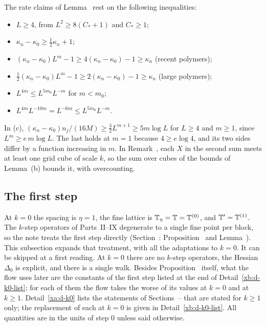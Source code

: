 \begin{detail}\label{xb:d-large}
The rate claims of Lemma~ rest on the following inequalities:
\begin{itemize}
\item $L\ge4$, from $L^2\ge8(C_*+1)$ and $C_*\ge1$;
\item $\kappa_n-\kappa_0\ge\frac12\kappa_n+1$;
\item $(\kappa_n-\kappa_0)L^m-1\ge4(\kappa_n-\kappa_0)-1\ge\kappa_n$ (recent polymers);
\item $\frac12(\kappa_n-\kappa_0)L^m-1\ge2(\kappa_n-\kappa_0)-1\ge\kappa_n$ (large polymers);
\item $L^{4m}\le L^{5m_0}L^{-m}$ for $m<m_0$;
\item $L^{4m}L^{-10m}=L^{-6m}\le L^{5m_0}L^{-m}$.
\end{itemize}
In (c), $(\kappa_n-\kappa_0)n_j/(16M)\ge\frac32L^{m+1}\ge5m\log L$ for $L\ge4$ and $m\ge1$, since $L^m\ge e\,m\log L$. The last holds at $m=1$ because $4\ge e\log4$, and its two sides differ by a function increasing in $m$. In Remark~, each $X$ in the second sum meets at least one grid cube of scale $k$, so the sum over cubes of the bounds of Lemma~(b) bounds it, with overcounting.
\end{detail}

\subsection{The first step}\label{xb:first}

At $k=0$ the spacing is $\eta=1$, the fine lattice is $\mathbb T_\eta=\mathbb T=\mathbb T^{(0)}$, and $\mathbb T'=\mathbb T^{(1)}$. The $k$-step operators of Parts~II--IX degenerate to a single fine point per block, so the note treats the first step directly (Section~: Proposition~ and Lemma~). This subsection expands that treatment, with all the adaptations to $k=0$. It can be skipped at a first reading. At $k=0$ there are no $k$-step operators, the Hessian $\Delta_0$ is explicit, and there is a single walk. Besides Proposition~ itself, what the flow uses later are the constants of the first step listed at the end of Detail~\ref{xb:d-k0-list}; for each of them the flow takes the worse of its values at $k=0$ and at $k\ge1$. Detail~\ref{xa:d-k0} lists the statements of Sections~-- that are stated for $k\ge1$ only; the replacement of each at $k=0$ is given in Detail~\ref{xb:d-k0-list}. All quantities are in the units of step $0$ unless said otherwise.

